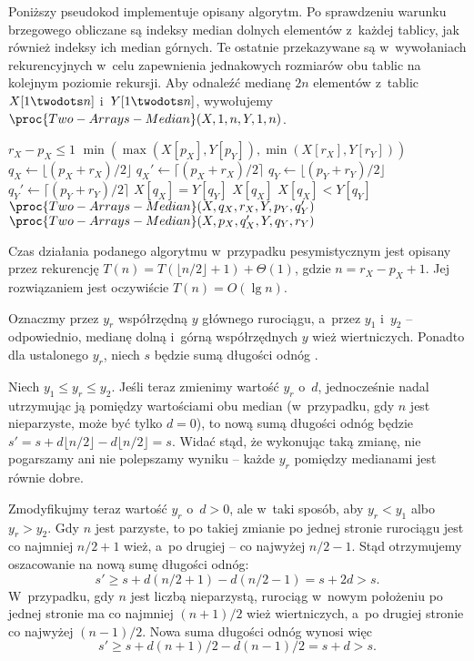 Poniższy pseudokod implementuje opisany algorytm. Po sprawdzeniu warunku brzegowego obliczane są indeksy median dolnych elementów z~każdej tablicy, jak również indeksy ich median górnych. Te ostatnie przekazywane są w~wywołaniach rekurencyjnych w~celu zapewnienia jednakowych rozmiarów obu tablic na kolejnym poziomie rekursji. Aby odnaleźć medianę $2n$ elementów z~tablic $X[1\twodots n]$ i~$Y[1\twodots n]$, wywołujemy $\proc{Two-Arrays-Median}(X,1,n,Y,1,n)$.

\begin{codebox}
\li	\If $r_X-p_X\le1$
\li		\Then \Return $\min(\max(X[p_X],Y[p_Y]),\min(X[r_X],Y[r_Y]))$
		\End
\li	$q_X\gets\lfloor(p_X+r_X)/2\rfloor$
\li	$q_X'\gets\lceil(p_X+r_X)/2\rceil$
\li	$q_Y\gets\lfloor(p_Y+r_Y)/2\rfloor$
\li	$q_Y'\gets\lceil(p_Y+r_Y)/2\rceil$
\li	\If $X[q_X]=Y[q_Y]$
\li		\Then \Return $X[q_X]$
		\End
\li	\If $X[q_X]<Y[q_Y]$
\li		\Then \Return $\proc{Two-Arrays-Median}(X,q_X,r_X,Y,p_Y,q_Y')$
\li		\Else \Return $\proc{Two-Arrays-Median}(X,p_X,q_X',Y,q_Y,r_Y)$
		\End
\end{codebox}

Czas działania podanego algorytmu w~przypadku pesymistycznym jest opisany przez rekurencję $T(n)=T(\lfloor n/2\rfloor+1)+\Theta(1)$, gdzie $n=r_X-p_X+1$. Jej rozwiązaniem jest oczywiście $T(n)=O(\lg n)$.

\exercise %
Oznaczmy przez $y_r$ współrzędną $y$ głównego rurociągu, a~przez $y_1$ i~$y_2$ -- odpowiednio, medianę dolną i~górną współrzędnych $y$ wież wiertniczych. Ponadto dla ustalonego $y_r$, niech $s$ będzie sumą długości odnóg .

Niech $y_1\le y_r\le y_2$. Jeśli teraz zmienimy wartość $y_r$ o~$d$, jednocześnie nadal utrzymując ją pomiędzy wartościami obu median (w~przypadku, gdy $n$ jest nieparzyste, może być tylko $d=0$), to nową sumą długości odnóg będzie $s'=s+d\lfloor n/2\rfloor-d\lfloor n/2\rfloor=s$. Widać stąd, że wykonując taką zmianę, nie pogarszamy ani nie polepszamy wyniku -- każde $y_r$ pomiędzy medianami jest równie dobre.

Zmodyfikujmy teraz wartość $y_r$ o~$d>0$, ale w~taki sposób, aby $y_r<y_1$ albo $y_r>y_2$. Gdy $n$ jest parzyste, to po takiej zmianie po jednej stronie rurociągu jest co najmniej $n/2+1$ wież, a~po drugiej -- co najwyżej $n/2-1$. Stąd otrzymujemy oszacowanie na nową sumę długości odnóg:
\[
    s' \ge s+d(n/2+1)-d(n/2-1) = s+2d > s.
\]
W~przypadku, gdy $n$ jest liczbą nieparzystą, rurociąg w~nowym położeniu po jednej stronie ma co najmniej $(n+1)/2$ wież wiertniczych, a~po drugiej stronie co najwyżej $(n-1)/2$. Nowa suma długości odnóg wynosi więc
\[
    s' \ge s+d(n+1)/2-d(n-1)/2 = s+d > s.
\]

